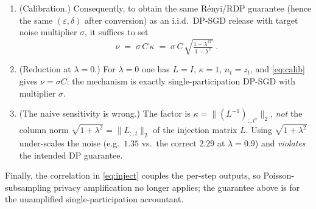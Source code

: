 \begin{theorem}
\begin{enumerate}[label=\textnormal{(\roman*)}]
multiplier $\sigma_{\mathrm{eff}}$, with equality for the worst-case neighbour:
$D_\alpha\big(M(D)\,\|\,M(D')\big)\le \alpha/(2\sigma_{\mathrm{eff}}^2)$ for all $\alpha>1$.
\item \textnormal{(Calibration.)} Consequently, to obtain the same R\'enyi/RDP guarantee (hence the
same $(\varepsilon,\delta)$ after conversion) as an i.i.d.\ DP\nobreakdash-SGD release with target noise
multiplier $\sigma$, it suffices to set
\begin{equation}
\boxed{\;\nu \;=\; \sigma\, C\, \kappa
\;=\;\sigma\,C\,\sqrt{\tfrac{1-\lambda^{2T}}{1-\lambda^{2}}}\; }.
\label{eq:calib}
\end{equation}
\item \textnormal{(Reduction at $\lambda=0$.)} For $\lambda=0$ one has $L=I$, $\kappa=1$, $n_t=z_t$,
and \eqref{eq:calib} gives $\nu=\sigma C$: the mechanism is exactly single-participation DP-SGD with
multiplier $\sigma$.
\item \textnormal{(The naive sensitivity is wrong.)} The factor is $\kappa=\|(L^{-1})_{:,t^\star}\|_2$,
\emph{not} the column norm $\sqrt{1+\lambda^2}=\|L_{:,t}\|_2$ of the injection matrix $L$. Using
$\sqrt{1+\lambda^2}$ under-scales the noise (e.g.\ $1.35$ vs.\ the correct $2.29$ at $\lambda=0.9$)
and \emph{violates} the intended DP guarantee.
\end{enumerate}
Finally, the correlation in \eqref{eq:inject} couples the per-step outputs, so Poisson-subsampling
privacy amplification no longer applies; the guarantee above is for the unamplified
single-participation accountant.
\end{theorem}

